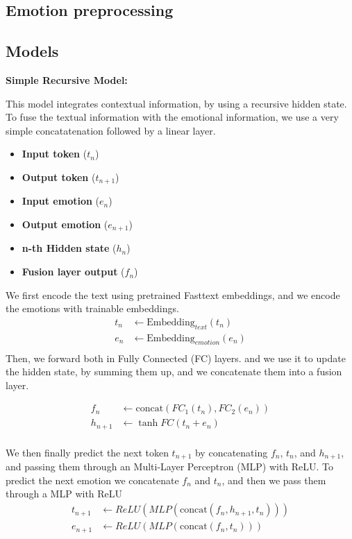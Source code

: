 \documentclass[oneside, a4paper, onecolumn, 11pt]{article}
\begin{document}
\subsection{Emotion preprocessing}
\subsection{Models}

\textbf{Simple Recursive Model:}

This model integrates contextual information, by using a recursive hidden state. To fuse the textual information with the emotional information,
we use a very simple concatatenation followed by a linear layer.

\begin{itemize}
  \item \textbf{Input token} ($t_n$)
  \item \textbf{Output token }($t_{n+1}$)
  \item \textbf{Input emotion }($e_n$)
  \item \textbf{Output emotion }($e_{n+1}$)
  \item \textbf{n-th Hidden state } ($h_n$)
  \item \textbf{Fusion layer output }($f_n$)
    

\end{itemize}

We first encode the text using pretrained Fasttext embeddings, and we encode the emotions with trainable embeddings.
\begin{align*}
  t_n &\leftarrow \text{Embedding}_{text}(t_n) \\
  e_n &\leftarrow \text{Embedding}_{emotion}(e_n) \\
\end{align*}
Then, we forward both in Fully Connected (FC) layers. and we use it to update the hidden state, by summing them up, and we concatenate them into a fusion layer.

\begin{align*}
  f_n &\leftarrow \text{concat}(FC_1(t_n),FC_2(e_n)) \\
  h_{n+1} &\leftarrow \tanh{FC(t_n + e_n)}\\
\end{align*}

We then finally predict the next token $t_{n+1}$ by concatenating $f_n$, $t_n$, and $h_{n+1}$, and passing them through an Multi-Layer Perceptron (MLP) with ReLU.
To predict the next emotion we concatenate $f_n$ and $t_n$, and then we pass them through a MLP with ReLU
\begin{align*}
  t_{n+1} &\leftarrow ReLU(MLP(\text{concat}(f_n,h_{n+1},t_n))) \\
  e_{n+1} &\leftarrow ReLU(MLP(\text{concat}(f_n,t_n))) \\
\end{align*}
\end{document}
